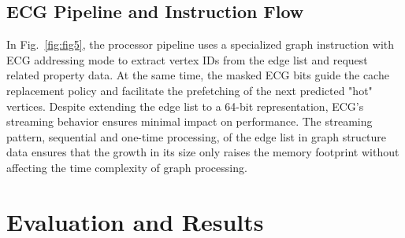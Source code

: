\documentclass[conference]{IEEEtran}
\newcommand*\circled[1]{\tikz[baseline=(char.base)]{
            \node[shape=circle,draw,inner sep=0.30pt] (char) {#1};}}
\begin{document}
\subsection{ECG Pipeline and Instruction Flow}

In Fig.~\ref{fig:fig5}, the processor pipeline \circled{\textcolor{BrickRed}3} uses a specialized graph instruction with ECG addressing mode to extract vertex IDs from the edge list and request related property data. At the same time, the masked ECG bits guide the cache replacement policy and facilitate the prefetching of the next predicted "hot" vertices. Despite extending the edge list to a 64-bit representation, ECG's streaming behavior ensures minimal impact on performance. The streaming pattern, sequential and one-time processing, of the edge list in graph structure data ensures that the growth in its size only raises the memory footprint without affecting the time complexity of graph processing.

\section{Evaluation and Results}
\label{ECG:Evaluation}
\end{document}
